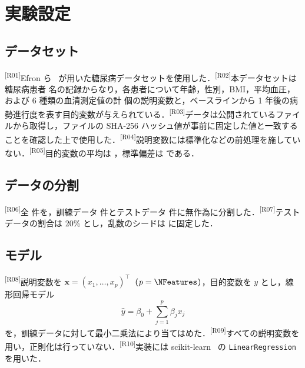 \documentclass[9pt,a4paper,twocolumn]{ltjsarticle}
\newcommand{\sid}[1]{\textsuperscript{\textsf{\scriptsize[#1]}}}
\begin{document}

\section{実験設定}

\subsection{データセット}
\sid{R01}Efron ら~\cite{efron2004} が用いた糖尿病データセットを使用した．\sid{R02}本データセットは糖尿病患者 \NSamples{} 名の記録からなり，各患者について年齢，性別，BMI，平均血圧，および 6 種類の血清測定値の計 \NFeatures{} 個の説明変数と，ベースラインから 1 年後の病勢進行度を表す目的変数が与えられている．\sid{R03}データは公開されているファイルから取得し，ファイルの SHA-256 ハッシュ値が事前に固定した値と一致することを確認した上で使用した．\sid{R04}説明変数には標準化などの前処理を施していない．\sid{R05}目的変数の平均は \TargetMean{}，標準偏差は \TargetStd{} である．

\subsection{データの分割}
\sid{R06}全 \NSamples{} 件を，訓練データ \NTrain{} 件とテストデータ \NTest{} 件に無作為に分割した．\sid{R07}テストデータの割合は 20\% とし，乱数のシードは \Seed{} に固定した．

\subsection{モデル}
\sid{R08}説明変数を $\boldsymbol{x} = (x_1, \dots, x_p)^\top$（$p = \NFeatures$），目的変数を $y$ とし，線形回帰モデル
\begin{equation}
  \hat{y} = \beta_0 + \sum_{j=1}^{p} \beta_j x_j
  \label{eq:model}
\end{equation}
を，訓練データに対して最小二乗法により当てはめた．\sid{R09}すべての説明変数を用い，正則化は行っていない．\sid{R10}実装には scikit-learn~\cite{sklearn} の \texttt{LinearRegression} を用いた．
\end{document}
